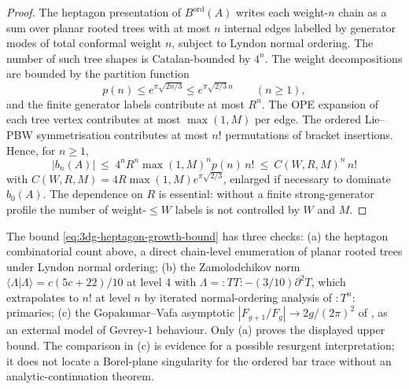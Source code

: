 \begin{proof}
The heptagon presentation of $B^{\mathrm{ord}}(A)$ writes each
weight-$n$ chain as a sum over planar rooted trees with at most \(n\)
internal edges labelled by generator modes of total conformal weight
\(n\), subject to Lyndon normal ordering. The number of such tree
shapes is Catalan-bounded by \(4^{n}\).  The weight decompositions are
bounded by the partition function
\[
p(n)\le e^{\pi\sqrt{2n/3}}\le e^{\pi\sqrt{2/3}\,n}\qquad(n\ge1),
\]
and the finite generator labels contribute at most \(R^n\).  The OPE
expansion of each tree vertex contributes at most
\(\max(1,M)\) per edge.  The ordered Lie--PBW symmetrisation contributes
at most \(n!\) permutations of bracket insertions.  Hence, for
\(n\ge1\),
\[
|b_{n}(A)|\ \le\ 4^n R^n \max(1,M)^n p(n)\,n!
\ \le\ C(W,R,M)^{n}\, n!
\]
with \(C(W,R,M)=4R\max(1,M)e^{\pi\sqrt{2/3}}\), enlarged if necessary
to dominate \(b_0(A)\).  The dependence on \(R\) is essential: without a
finite strong-generator profile the number of weight-\(\le W\) labels is
not controlled by \(W\) and \(M\).
\end{proof}

\begin{remark}
\label{rem:3dg-heptagon-growth-bound-verification}
%
The bound \eqref{eq:3dg-heptagon-growth-bound} has three checks:
(a) the heptagon combinatorial count
above, a direct chain-level enumeration of planar rooted trees under
Lyndon normal ordering; (b) the Zamolodchikov norm
$\langle\Lambda|\Lambda\rangle = c(5c + 22)/10$ at level 4 with
$\Lambda = {:}TT{:} - (3/10)\partial^{2} T$, which extrapolates to
$n!$ at level $n$ by iterated normal-ordering analysis of
${:}T^{n}{:}$ primaries; (c) the Gopakumar--Vafa asymptotic
$|F_{g+1}/F_{g}| \to 2g/(2\pi)^{2}$ of \cite{GopakumarVafa1998},
as an external model of Gevrey-$1$ behaviour. Only (a) proves the
displayed upper bound. The comparison in (c) is evidence for a
possible resurgent interpretation; it does not locate a Borel-plane
singularity for the ordered bar trace without an analytic-continuation
theorem.
\end{remark}

